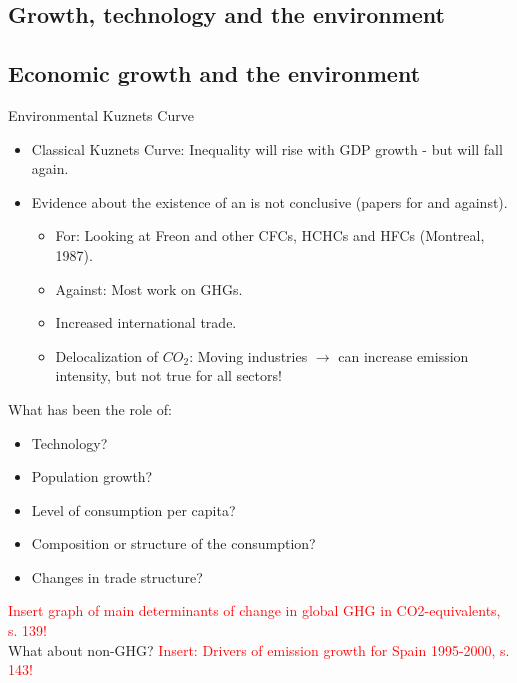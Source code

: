 \subsection{Growth, technology and the environment} %
\begin{multicols}{2}

\subsection{Economic growth and the environment} \noindent
Environmental Kuznets Curve
\begin{itemize}
  \item Classical Kuznets Curve: Inequality will rise with GDP growth - but will fall again.
  \item Evidence about the existence of an  is not conclusive (papers for and against).
  \begin{itemize}
    \item For: Looking at Freon and other CFCs, HCHCs and HFCs (Montreal, 1987).
    \item Against: Most work on GHGs.
    \item Increased international trade.
    \item Delocalization of $CO_2$: Moving industries $\rightarrow$ can increase emission intensity, but not true for all sectors!
  \end{itemize}
\end{itemize}
What has been the role of:
\begin{itemize}
  \item Technology?
  \item Population growth?
  \item Level of consumption per capita?
  \item Composition or structure of the consumption?
  \item Changes in trade structure?
\end{itemize}
\end{multicols}\noindent
\textcolor{red}{Insert graph of main determinants of change in global GHG in CO2-equivalents, s. 139!}\\
What about non-GHG?
\textcolor{red}{Insert: Drivers of emission growth for Spain 1995-2000, s. 143!}\\



